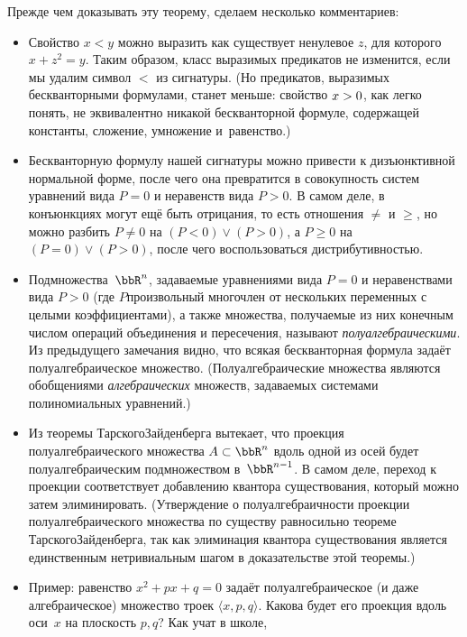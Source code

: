 Прежде чем доказывать эту теорему, сделаем
не\-ско\-ль\-ко комментариев:
\begin{itemize}
        \item
Свойство $x<y$ можно выразить как  существует ненулевое $z$,
для которого $x+z^2=y$. Таким образом, класс выразимых
предикатов не изменится, если мы удалим символ $<$ из сигнатуры.
(Но предикатов, выразимых бескванторными формулами, станет
меньше: свойство $x\hm>0$, как легко понять, не эквивалентно
никакой бескванторной формуле, содержащей константы,
сложение, умножение и~равенство.)
        \item
Бескванторную формулу нашей сигнатуры можно привести к
дизъюнктивной нормальной форме, после чего она превратится в
совокупность систем уравнений вида $P=0$ и неравенств вида
$P>0$. В самом деле, в конъюнкциях могут ещё быть отрицания, то
есть отношения $\ne$ и $\ge$, но можно разбить $P\ne 0$ на
$(P<0)\lor (P>0)$, а $P\ge 0$ на $(P=0)\lor (P>0)$, после чего
воспользоваться дистрибутивностью.
        \item
Подмножества~$\bbR^n$,
задаваемые уравнениями вида $P=0$ и неравенствами
вида $P>0$ (где $P$\т произвольный многочлен от нескольких
переменных с целыми коэффициентами), а также множества,
получаемые из них конечным числом операций объединения и
пересечения, называют \emph{полуалгебраическими}.%
%
Из пре\-ды\-дущего
замечания видно, что всякая бескванторная формула задаёт
полуалгебраическое множество. (Полуалгебраические множества
являются обобщениями \emph{алгебраических}%
%
множеств,
задаваемых системами полиномиальных уравнений.)
        \item
Из теоремы Тарского\ч Зайденберга вытекает, что проекция
полуалгебраического множества $A\subset\bbR^n$ вдоль одной из
осей будет полуалгебраическим подмножеством в~$\bbR^{n-1}$. В самом деле, переход к проекции соответствует
добавлению квантора существования, который можно затем
элиминировать. (Утверждение о полуалгебраичности проекции
полуалгебраического множества по существу равносильно теореме
Тарского\ч Зайденберга, так как элиминация квантора
существования является единственным нетривиальным шагом в
доказательстве этой теоремы.)
        \item
Пример: равенство $x^2+px+q=0$ задаёт полуалгебраическое (и даже
алгебраическое) множество троек $\langle x,p,q\rangle$. Какова будет
его проекция вдоль оси~$x$ на плоскость $p,q$? Как учат в школе,

\end{itemize}
